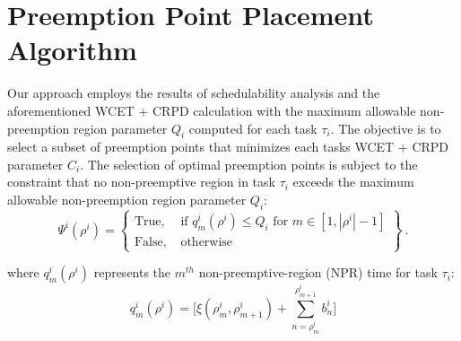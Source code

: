 \section{Preemption Point Placement Algorithm}\label{sec:implementation}

Our approach employs the results of schedulability analysis and the aforementioned WCET + CRPD calculation with the maximum allowable non-preemption region parameter \begin{math}Q_{i}\end{math} computed for each task \begin{math}\tau_{i}\end{math}.  The objective is to select a subset of preemption points that minimizes each tasks WCET + CRPD parameter \begin{math}C_{i}\end{math}. The selection of optimal preemption points is subject to the constraint that no non-preemptive region in task \begin{math}\tau_{i}\end{math} exceeds the maximum allowable non-preemption region parameter \begin{math}Q_{i}\end{math}:
\begin{equation}\label{eqn:pp-constraint}
   \Psi^{i}(\rho^{i}) =
\left\{
\begin{array}{lr}
    \textrm{True, }&\textrm{if } q_{m}^{i}(\rho^{i}) \leq Q_{i} \textrm{ for } m \in [1,|\rho^{i}|-1] \\
    \textrm{False, }&\textrm{otherwise}
\end{array}
\right\}~.
\end{equation}

\noindent
where \begin{math}q_{m}^{i}(\rho^{i})\end{math} represents the \begin{math}m^{th}\end{math} non-preemptive-region (NPR) time for task \begin{math}\tau_{i}\end{math}:
\begin{equation}\label{eqn:mthnpr-time}
   q_{m}^{i}(\rho^{i}) = \Big[\xi(\rho_{m}^{i},\rho_{m+1}^{i}) + \sum_{n=\rho_{m}^{i}}^{\rho_{m+1}^{i}}b_{n}^{i}\Big]
\end{equation}

